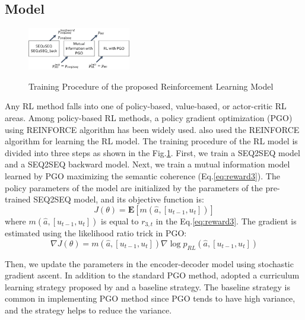 \subsection{Model}
\begin{figure}[b!]
    \centering
    \includegraphics[width=0.4\textwidth]{three_steps.png} 
    \label{fig:three_steps}
    \caption{\small Training Procedure of the proposed Reinforcement Learning Model}
 \end{figure}
Any RL method falls into one of policy-based, value-based, or actor-critic RL areas. Among policy-based RL methods, a policy gradient optimization (PGO) using REINFORCE algorithm \cite{Williams} has been widely used. \cite{Li} also used the REINFORCE algorithm for learning the RL model. The training procedure of the RL model is divided into three steps as shown in the Fig.\ref{fig:three_steps}. First, we train a SEQ2SEQ model and a SEQ2SEQ backward model. Next, we train a mutual information model learned by PGO maximizing the semantic coherence (Eq.\ref{eq:reward3}). The policy parameters of the model are initialized by the parameters of the pre-trained SEQ2SEQ model, and its objective function is:
\begin{equation}
	J(\theta)= 	\mathbf{E} [m(\hat{a},[u_{t-1},u_t])]
\end{equation}
where $m(\hat{a},[u_{t-1},u_t])$ is equal to $r_{3,t}$ in the Eq.\ref{eq:reward3}. The gradient is estimated using the likelihood ratio trick in PGO:
\begin{equation}
	\nabla J(\theta) = m(\hat{a},[u_{t-1},u_t]) \nabla \log p_{RL}(\hat{a},[u_{t-1},u_t]) \label{eq:gradient}
\end{equation}

Then, we update the parameters in the encoder-decoder model using stochastic gradient ascent. In addition to the standard PGO method, \cite{Li} adopted a curriculum learning strategy proposed by \cite{Ranzato} and a baseline strategy. The baseline strategy is common in implementing PGO method since PGO tends to have high variance, and the strategy helps to reduce the variance.

